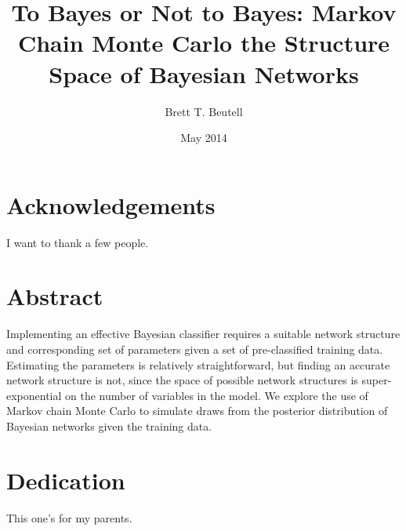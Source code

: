 \documentclass[12pt,twoside]{reedthesis}
\title{To Bayes or Not to Bayes: Markov Chain Monte Carlo  the Structure Space of Bayesian Networks}
\author{Brett T. Beutell}
\date{May 2014}
\begin{document}
  \maketitle
  \frontmatter %
  \pagestyle{empty} %

    \chapter*{Acknowledgements}
	I want to thank a few people.


    \tableofcontents

    \chapter*{Abstract}
	Implementing an effective Bayesian classifier requires a suitable network structure and corresponding set of parameters given a set of pre-classified training data. Estimating the parameters is relatively straightforward, but finding an accurate network structure is not, since the space of possible network structures is super-exponential on the number of variables in the model. We explore the use of Markov chain Monte Carlo to simulate draws from the posterior distribution of Bayesian networks given the training data.
	
	\chapter*{Dedication}
	This one's for my parents.

  \mainmatter %
  \pagestyle{fancyplain} %

\end{document}
